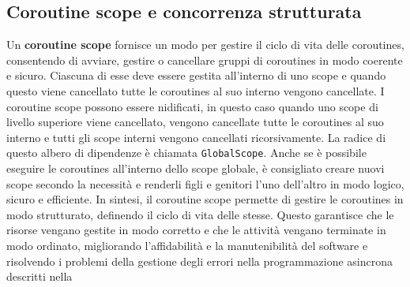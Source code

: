 \documentclass[12pt,a4paper,openright,twoside]{book}
\begin{document}
\subsection{Coroutine scope e concorrenza strutturata}
Un \textbf{coroutine scope} fornisce un modo per gestire il ciclo di vita delle coroutines, consentendo di avviare, gestire o cancellare gruppi di coroutines in modo coerente e sicuro. Ciascuna di esse deve essere gestita all'interno di uno scope e quando questo viene cancellato tutte le coroutines al suo interno vengono cancellate. I coroutine scope possono essere nidificati, in questo caso quando uno scope di livello superiore viene cancellato, vengono cancellate tutte le coroutines al suo interno e tutti gli scope interni vengono cancellati ricorsivamente. La radice di questo albero di dipendenze è chiamata \texttt{GlobalScope}. Anche se è possibile eseguire le coroutines all'interno dello scope globale, è consigliato creare nuovi scope secondo la necessità e renderli figli e genitori l'uno dell'altro in modo logico, sicuro e efficiente. 
In sintesi, il coroutine scope permette di gestire le coroutines in modo strutturato, definendo il ciclo di vita delle stesse. Questo garantisce che le risorse vengano gestite in modo corretto e che le attività vengano terminate in modo ordinato, migliorando l'affidabilità e la manutenibilità del software e risolvendo i problemi della gestione degli errori nella programmazione asincrona descritti nella~
\end{document}
